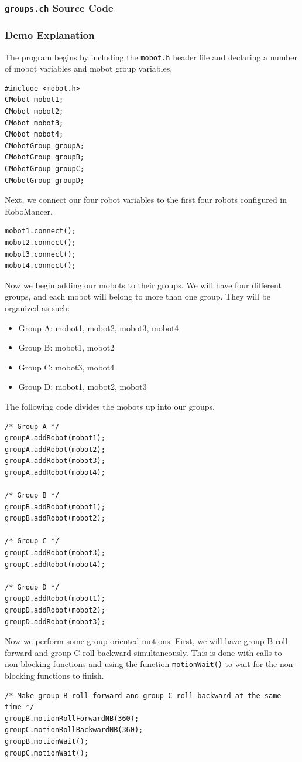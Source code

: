 \documentclass{article}
\begin{document}
\subsubsection{\texttt{groups.ch} Source Code}

\subsubsection{Demo Explanation}
The program begins by including the \texttt{mobot.h} header file
and declaring a number of mobot variables and mobot group variables.
\begin{verbatim}
#include <mobot.h>
CMobot mobot1;
CMobot mobot2;
CMobot mobot3;
CMobot mobot4;
CMobotGroup groupA;
CMobotGroup groupB;
CMobotGroup groupC;
CMobotGroup groupD;
\end{verbatim}

Next, we connect our four robot variables to the first four robots 
configured in RoboMancer.
\begin{verbatim}
mobot1.connect();
mobot2.connect();
mobot3.connect();
mobot4.connect();
\end{verbatim}

Now we begin adding our mobots to their groups. We will have four different groups, and each mobot
will belong to more than one group. They will be organized as such:
\begin{itemize}
\item Group A: mobot1, mobot2, mobot3, mobot4
\item Group B: mobot1, mobot2
\item Group C: mobot3, mobot4
\item Group D: mobot1, mobot2, mobot3
\end{itemize}
The following code divides the mobots up into our groups.
\begin{verbatim}
/* Group A */
groupA.addRobot(mobot1);
groupA.addRobot(mobot2);
groupA.addRobot(mobot3);
groupA.addRobot(mobot4);

/* Group B */
groupB.addRobot(mobot1);
groupB.addRobot(mobot2);

/* Group C */
groupC.addRobot(mobot3);
groupC.addRobot(mobot4);

/* Group D */
groupD.addRobot(mobot1);
groupD.addRobot(mobot2);
groupD.addRobot(mobot3);
\end{verbatim}

Now we perform some group oriented motions. First, we will have group B roll forward and group C
roll backward simultaneously. This is done with calls to non-blocking functions and using the
function \texttt{motionWait()} to wait for the non-blocking functions to finish.
\begin{verbatim}
/* Make group B roll forward and group C roll backward at the same time */
groupB.motionRollForwardNB(360);
groupC.motionRollBackwardNB(360);
groupB.motionWait();
groupC.motionWait();
\end{verbatim}
\end{document}
